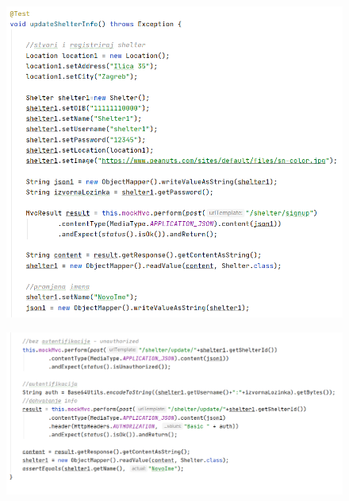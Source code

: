 	 		\begin{figure}[H]
	 				\hspace*{-0.6in}
	 				\includegraphics[scale=0.75]{slike/shelter3.1.PNG} %
	 			\centering
	 		\end{figure}
	 		\begin{figure}[H]
	 			\hspace*{-0.6in}	
	 			\includegraphics[scale=0.75]{slike/shelter3.2.PNG} %
	 			\centering
	 		\end{figure}
 		
 		
 		
